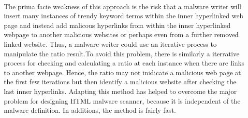 \paragraph{} 
The prima facie weakness of this approach is the risk that a malware writer will insert many instances of trendy keyword terms within the inner hyperlinked web page and instead add malicous hyperlinks from within the inner hyperlinked webpage to another malicious websites or perhaps even from a further removed linked website. Thus, a malware writer could use an iterative process to manipulate the ratio result.To avoid this problem, there is similarly a iterrative process for checking and calculating a ratio at each instance when there are links to another webpage. Hence, the ratio may not inidicate a malicious web page at the first few iterations but then identify a malicious website after checking the last inner hyperlinks. Adapting this method has helped to overcome the major problem for designing HTML malware scanner, because it is independent of the malware definition. In additions, the method is fairly fast.  
